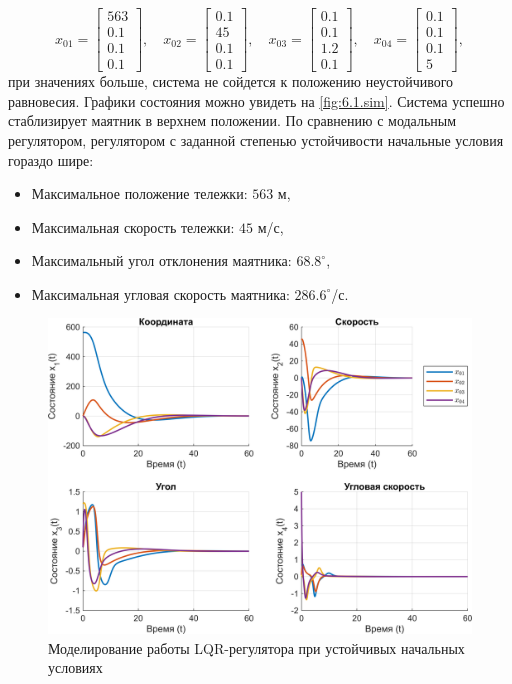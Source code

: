 \begin{equation*}
    x_{01}=\begin{bmatrix}
        563\\
        0.1\\
        0.1\\
        0.1
    \end{bmatrix},\quad
    x_{02}=\begin{bmatrix}
        0.1\\
        45\\
        0.1\\
        0.1
    \end{bmatrix},\quad
    x_{03}=\begin{bmatrix}
        0.1\\
        0.1\\
        1.2\\
        0.1
    \end{bmatrix},\quad
    x_{04}=\begin{bmatrix}
        0.1\\
        0.1\\
        0.1\\
        5
    \end{bmatrix},
\end{equation*}
при значениях больше, система не сойдется к положению неустойчивого равновесия.
Графики состояния можно увидеть на \autoref{fig:6.1.sim}. Система успешно
стаблизирует маятник в верхнем положении. По сравнению с модальным регулятором,
регулятором с заданной степенью устойчивости начальные условия гораздо шире:
\begin{itemize}
    \item Максимальное положение тележки: $563$ м,
    \item Максимальная скорость тележки: $45$ м/с,
    \item Максимальный угол отклонения маятника: $68.8^\circ$,
    \item Максимальная угловая скорость маятника: $286.6^\circ$/с.
    \end{itemize}
\begin{figure}[H]
    \centering
    \includegraphics[width=\linewidth]{figs/6.1.sim.png}
    \caption{Моделирование работы LQR-регулятора при устойчивых 
    начальных условиях}
    \label{fig:6.1.sim}
\end{figure}

